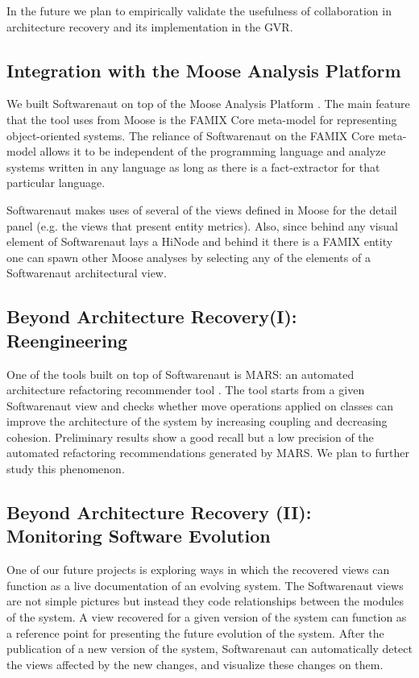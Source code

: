 \documentclass[preprint,12pt]{elsarticle}
\begin{document}
In the future we plan to empirically validate the usefulness of collaboration in architecture recovery and its implementation in the GVR.


\subsection {Integration with the Moose Analysis Platform}
We built Softwarenaut on top of the Moose Analysis Platform \cite{nier-story}. The main feature that the tool uses from Moose is the FAMIX Core meta-model for representing object-oriented systems. The reliance of Softwarenaut on the FAMIX Core meta-model allows it to be independent of the programming language and analyze systems written in any language as long as there is a fact-extractor for that particular language. 

Softwarenaut makes uses of several of the views defined in Moose for the detail panel (e.g. the views that present entity metrics). Also, since behind any visual element of Softwarenaut lays a HiNode and behind it there is a FAMIX entity one can spawn other Moose analyses by selecting any of the elements of a Softwarenaut architectural view. 



\subsection {Beyond Architecture Recovery(I): Reengineering}
One of the tools built on top of Softwarenaut is MARS: an automated architecture refactoring recommender tool \cite{boeckmann-mars}. The tool starts from a given Softwarenaut view and checks whether move operations applied on classes can improve the architecture of the system by increasing coupling and decreasing cohesion. Preliminary results show a good recall but a low precision of the  automated refactoring recommendations generated by MARS. We plan to further study this phenomenon.


\subsection {Beyond Architecture Recovery (II): Monitoring Software Evolution}

One of our future projects is exploring ways in which the recovered views can function as a live documentation of an evolving system. The Softwarenaut views are not simple pictures but instead they code relationships between the modules of the system. A view recovered for a given version of the system can function as a reference point for presenting the future evolution of the system. After the publication of a new version of the system, Softwarenaut can automatically detect the views affected by the new changes, and visualize these changes on them.
\end{document}
